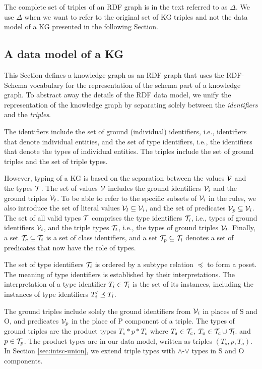\documentclass[runningheads]{llncs}
\newcommand{\V}{{\cal V}}
\newcommand{\T}{{\cal T}}
\begin{document}
The complete set of triples of an RDF graph is in the text
referred to as $\Delta$. We use $\Delta$ when we want to refer
to the original set of KG triples and not the data model of a KG
presented in the following Section.






\subsection{A data model of a KG}

This Section defines a knowledge graph as an RDF graph that uses the
RDF-Schema vocabulary \cite{rdfschema} for the representation of the
schema part of a knowledge graph. To abstract away the details of the
RDF data model, we unify the representation of the knowledge graph by
separating solely between the \emph{identifiers} and the
\emph{triples}.

The identifiers include the set of ground (individual) identifiers,
i.e., identifiers that denote individual entities, and the set of type
identifiers, i.e., the identifiers that denote the types of individual
entities. The triples include the set of ground triples and the set of
triple types.

However, typing of a KG is based on the separation between the values
$\V$ and the types $\T$. The set of values $\V$ includes the ground
identifiers $\V_i$ and the ground triples $\V_t$. To be able to refer
to the specific subsets of $\V_i$ in the rules, we also introduce the
set of literal values $\V_l\subseteq\V_i$, and the set of predicates
$\V_p\subseteq\V_i$. The set of all valid types $\T$ comprises the
type identifiers $\T_i$, i.e., types of ground identifiers $\V_i$, and
the triple types $\T_t$, i.e., the types of ground triples $\V_t$.
Finally, a set $\T_c\subseteq\T_i$ is a set of class identifiers, and
a set $\T_p\subseteq\T_i$ denotes a set of predicates that now have
the role of types.

The set of type identifiers $\T_i$ is ordered by a subtype relation
$\preceq$ to form a poset. The meaning of type identifiers is
established by their interpretations. The interpretation of a type
identifier $T_i\in\T_i$ is the set of its instances, including the
instances of type identifiers $T_i'\preceq\/T_i$.

The ground triples include solely the ground identifiers from $\V_i$
in places of S and O, and predicates $\V_p$ in the place of P
component of a triple. The types of ground triples are the product
types $T_s*p*T_o$ where $T_s\in\T_c$, $T_o\in\T_c\cup\T_l$. and
$p\in\T_p$. The product types are in our data model, written as
triples $(T_s,p,T_o)$. In Section \ref{sec:intsc-union}, we extend
triple types with $\land$-$\lor$ types in S and O components.
\end{document}

